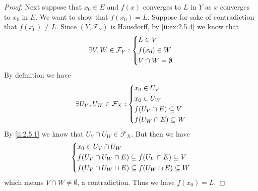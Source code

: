 \begin{proof}
  Next suppose that \(x_0 \in E\) and \(f(x)\) converges to \(L\) in \(Y\) as \(x\) converges to \(x_0\) in \(E\).
  We want to show that \(f(x_0) = L\).
  Suppose for sake of contradiction that \(f(x_0) \neq L\).
  Since \((Y, \mathcal{F}_Y)\) is Hausdorff, by \cref{ii:ex:2.5.4} we know that
  \[
    \exists V, W \in \mathcal{F}_Y : \begin{dcases}
      L \in V      \\
      f(x_0) \in W \\
      V \cap W = \emptyset
    \end{dcases}
  \]
  By definition we have
  \[
    \exists U_V, U_W \in \mathcal{F}_X : \begin{dcases}
      x_0 \in U_V               \\
      x_0 \in U_W               \\
      f(U_V \cap E) \subseteq V \\
      f(U_W \cap E) \subseteq W
    \end{dcases}
  \]
  By \cref{ii:2.5.1} we know that \(U_V \cap U_W \in \mathcal{F}_X\).
  But then we have
  \[
    \begin{dcases}
      x_0 \in U_V \cap U_W                                       \\
      f(U_V \cap U_W \cap E) \subseteq f(U_V \cap E) \subseteq V \\
      f(U_V \cap U_W \cap E) \subseteq f(U_W \cap E) \subseteq W
    \end{dcases}
  \]
  which means \(V \cap W \neq \emptyset\), a contradiction.
  Thus we have \(f(x_0) = L\).


\end{proof}
